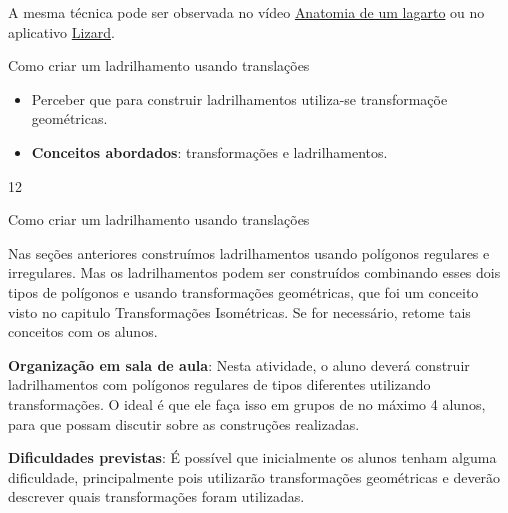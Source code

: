 {A mesma técnica pode ser observada no vídeo \href{ https://youtu.be/T6L6bE_bTMo}{Anatomia de um lagarto} ou no  aplicativo \href{https://www.geogebra.org/m/zs2ud4w5} {Lizard}.


\needspace{.2\textheight}
\def\currentcolor{session2}

\begin{objectives}{Como criar um ladrilhamento usando translações}
{
	\begin{itemize}
	\item Perceber que para construir ladrilhamentos utiliza-se transformaçõe geométricas.
	\item \textbf{Conceitos abordados}: transformações e ladrilhamentos.
	\end{itemize}
}{1}{2}
\end{objectives}
\begin{sugestions}{Como criar um ladrilhamento usando translações}
{
	Nas seções anteriores construímos ladrilhamentos usando polígonos regulares e irregulares. Mas os ladrilhamentos podem ser construídos combinando esses dois tipos de polígonos e usando transformações geométricas, que foi um conceito visto no capitulo Transformações Isométricas. Se for necessário, retome tais conceitos com os alunos.

	\textbf{Organização em sala de aula}: Nesta atividade, o aluno deverá construir ladrilhamentos com polígonos regulares de tipos diferentes utilizando transformações. O ideal é que ele faça isso em grupos de no máximo 4 alunos, para que possam discutir sobre as construções realizadas. 

	\textbf{Dificuldades previstas}: É possível que inicialmente os alunos tenham alguma dificuldade, principalmente pois utilizarão transformações geométricas e deverão descrever quais transformações foram utilizadas.

}
\end{sugestions}}
